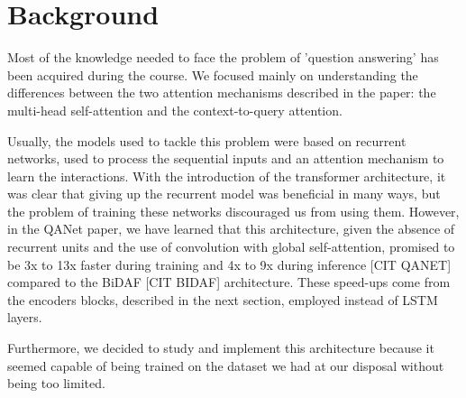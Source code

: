 \chapter{Background}
    Most of the knowledge needed to face the problem of 'question answering' has been acquired during the course. We focused mainly on understanding the differences between the two attention mechanisms
    described in the paper: the multi-head self-attention and the context-to-query attention.

    Usually, the models used to tackle this problem were based on recurrent networks, used to process the sequential inputs and an attention mechanism to learn the interactions. With the
    introduction of the transformer architecture, it was clear that giving up the recurrent model was beneficial in many ways, but the problem of training these networks discouraged us from using them.
    However, in the QANet paper, we have learned that this architecture, given the absence of recurrent units and the use of convolution with global self-attention, promised to be 3x to 13x faster during training
    and 4x to 9x during inference [CIT QANET] compared to the BiDAF [CIT BIDAF] architecture. These speed-ups come from the encoders blocks, described in the next section, employed instead of LSTM layers.

    Furthermore, we decided to study and implement this architecture because it seemed capable of being trained on the dataset we had at our disposal without being too limited.